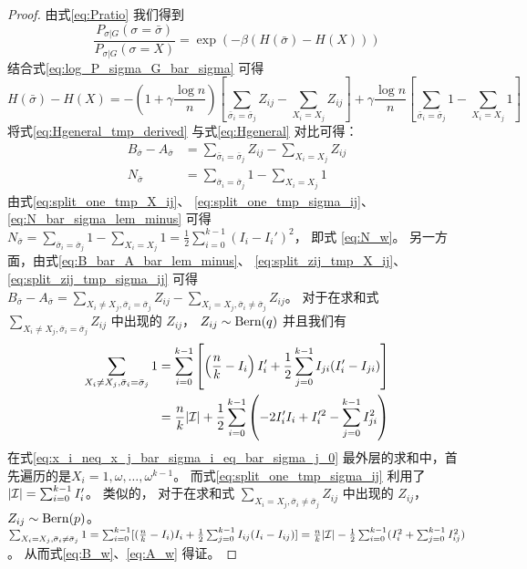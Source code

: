 \begin{proof}
  由式\eqref{eq:Pratio} 我们得到
  \begin{equation}
    \frac{P_{\sigma |G } (\sigma = \bar{\sigma})}
    {P_{\sigma |G } (\sigma = X)}
    = \exp(-\beta(H(\bar{\sigma})
    - H(X)))
  \end{equation}
  结合式\eqref{eq:log_P_sigma_G_bar_sigma}
  可得
  \begin{equation}\label{eq:Hgeneral_tmp_derived}
    H(\bar{\sigma}) - H(X)=
    -\left(1 + \gamma \frac{ \log n}{n}
    \right)
    \left[
      \sum_{\bar{\sigma}_i = \bar{\sigma}_j}Z_{ij} - \sum_{X_i = X_j}Z_{ij}
      \right]
    + \gamma\frac{ \log n}{n}
    \left[\sum_{\bar{\sigma}_i = \bar{\sigma}_j}1 - \sum_{X_i = X_j}1
    \right]
    \end{equation}
  将式\eqref{eq:Hgeneral_tmp_derived} 与式\eqref{eq:Hgeneral}
  对比可得：
  \begin{align}
    B_{\bar{\sigma}} - A_{\bar{\sigma}} &=
    \sum_{\bar{\sigma}_i = \bar{\sigma}_j}Z_{ij}
    - \sum_{X_i = X_j}Z_{ij}
    \label{eq:B_bar_A_bar_lem_minus}\\
    N_{\bar{\sigma}} &=
    \sum_{\bar{\sigma}_i = \bar{\sigma}_j} 1  -\sum_{X_i = X_j} 1
    \label{eq:N_bar_sigma_lem_minus}
  \end{align}
  由式\eqref{eq:split_one_tmp_X_ij}、
  \eqref{eq:split_one_tmp_sigma_ij}、 
  \eqref{eq:N_bar_sigma_lem_minus} 可得
  $N_{\bar{\sigma}} = \sum_{\bar{\sigma}_i = \bar{\sigma}_j} 1  -\sum_{X_i = X_j} 1 = \frac{1}{2}\sum_{i=0}^{k-1} (I_i - I_i')^2 $，
  即式 \eqref{eq:N_w}。
	另一方面，由式\eqref{eq:B_bar_A_bar_lem_minus}、
  \eqref{eq:split_zij_tmp_X_ij}、 
  \eqref{eq:split_zij_tmp_sigma_ij}
  可得 $B_{\bar{\sigma}} - A_{\bar{\sigma}} = \sum_{X_i \neq X_j, \bar{\sigma}_i = \bar{\sigma}_j} Z_{ij} - \sum_{X_i = X_j, \bar{\sigma}_i \neq \bar{\sigma}_j} Z_{ij}$。
	对于在求和式 $\sum_{X_i \neq X_j, \bar{\sigma}_i = \bar{\sigma}_j} Z_{ij}$
  中出现的 $Z_{ij}$， $Z_{ij} \sim \operatorname{Bern}(q)$
  并且我们有
  \begin{align}
  \sum_{X_i \neq X_j, \bar{\sigma}_i = \bar{\sigma}_j} 1 
  &= \sum_{i=0}^{k-1}
  \left[
    \left(\frac{n}{k} - I_i \right)
    I_i' + \frac{1}{2} \sum_{j=0}^{k-1} I_{ji}(I'_i - I_{ji}) 
  \right] 
  \label{eq:x_i_neq_x_j_bar_sigma_i_eq_bar_sigma_j_0}\\
	&=\frac{n}{k}|\mathcal{I}| + \frac{1}{2}\sum_{i=0}^{k-1}  
  \left(-2 I'_i I_i  + I'^2_i - \sum_{j=0}^{k-1} I^2_{ji}\right) 
  \label{eq:x_i_neq_x_j_bar_sigma_i_eq_bar_sigma_j_1}
  \end{align}
  在式\eqref{eq:x_i_neq_x_j_bar_sigma_i_eq_bar_sigma_j_0}
  最外层的求和中，首先遍历的是$X_i=1, \omega, \dots, \omega^{k-1}$。  
  而式\eqref{eq:split_one_tmp_sigma_ij}
  利用了
  $|\mathcal{I}| = \sum_{i=0}^{k-1} I'_i$。
  类似的，
  对于在求和式 $\sum_{X_i = X_j, \bar{\sigma}_i \neq \bar{\sigma}_j} Z_{ij}$
  中出现的 $Z_{ij}$， $Z_{ij} \sim \operatorname{Bern}(p)$。
	$\sum_{X_i = X_j, \bar{\sigma}_i \neq \bar{\sigma}_j} 1
	= \sum_{i=0}^{k-1}[(\frac{n}{k} - I_i) I_i + \frac{1}{2} \sum_{j=0}^{k-1} I_{ij}(I_i - I_{ij}) ] 
	= \frac{n}{k}|\mathcal{I}| - \frac{1}{2}\sum_{i=0}^{k-1}  (I^2_i + \sum_{j=0}^{k-1} I^2_{ij})$。
  从而式\eqref{eq:B_w}、\eqref{eq:A_w} 得证。
\end{proof}

